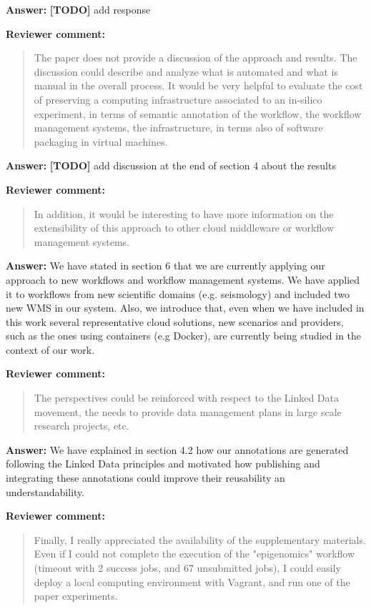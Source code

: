 \documentclass{letter}
\newenvironment{review}%
{\textbf{Reviewer comment:}\begin{quote}}%
{\end{quote}}%
\newcommand{\todo}[1]{%
      \color{red}\textbf{[TODO]} #1\color{black}}
\newcommand{\answer}[1]{%
      \textbf{Answer:} #1}
\begin{document}
\begin{letter}{}
\answer{\todo{add response}}


\begin{review}
The paper does not provide a discussion of the approach and results. The discussion could describe and analyze what is automated and what is manual in the overall process. It would be very helpful to evaluate the cost of preserving a computing infrastructure associated to an in-silico experiment, in terms of semantic annotation of the workflow, the workflow management systems, the infrastructure, in terms also of software packaging in virtual machines.
\end{review}

\answer{\todo{add discussion at the end of section 4 about the results}}


\begin{review}
In addition, it would be interesting to have more information on the extensibility of this approach to other cloud middleware or workflow management systems.
\end{review}

\answer{We have stated in section 6 that we are currently applying our approach to new workflows and workflow management systems. We have applied it to workflows from new scientific domains (e.g. seismology) and included two new WMS in our system.} Also, we introduce that, even when we have included in this work several representative cloud solutions, new scenarios and providers, such as the ones using containers (e.g Docker), are currently being studied in the context of our work.



\begin{review}
The perspectives could be reinforced with respect to the Linked Data movement, the needs to provide data management plans in large scale research projects, etc.
\end{review}

\answer{We have explained in section 4.2 how our annotations are generated following the Linked Data principles and motivated how publishing and integrating these annotations could improve their reusability an understandability.}


\begin{review}
Finally, I really appreciated the availability of the supplementary materials. Even if I could not complete the execution of the "epigenomics" workflow (timeout with 2 success jobs, and 67 unsubmitted jobs), I could easily deploy a local computing environment with Vagrant, and run one of the paper experiments.
\end{review}


\end{letter}
\end{document}
